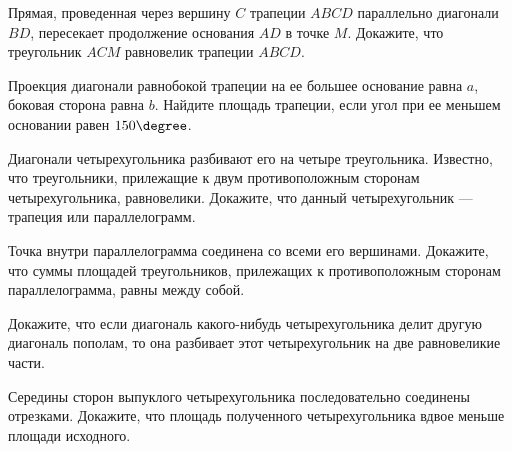 \begin{class}[number=3]
	\begin{listofex}
		\item Прямая, проведенная через вершину \( C \) трапеции \( ABCD \) параллельно диагонали \( BD \), пересекает продолжение основания \( AD \) в точке \( M \). Докажите, что треугольник \( ACM \) равновелик трапеции \( ABCD \).
		\item Проекция диагонали равнобокой трапеции на ее большее основание равна \( a \), боковая сторона равна \( b \). Найдите площадь трапеции, если угол при ее меньшем основании равен \( 150\degree \).
		\item Диагонали четырехугольника разбивают его на четыре треугольника. Известно, что треугольники, прилежащие к двум противоположным сторонам четырехугольника, равновелики. Докажите, что данный четырехугольник --- трапеция или параллелограмм.
		\item Точка внутри параллелограмма соединена со всеми его вершинами. Докажите, что суммы площадей треугольников, прилежащих к противоположным сторонам параллелограмма, равны между собой.
		\item Докажите, что если диагональ какого-нибудь четырехугольника делит другую диагональ пополам, то она разбивает этот четырехугольник на две равновеликие части.
		\item Середины сторон выпуклого четырехугольника последовательно соединены отрезками. Докажите, что площадь	полученного четырехугольника вдвое меньше площади исходного.
	\end{listofex}
\end{class}

